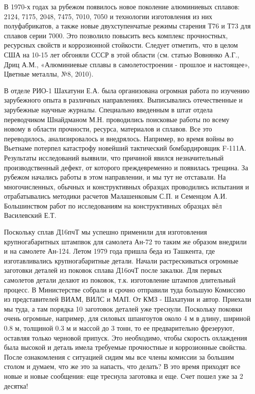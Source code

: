 В 1970-х годах за рубежом появилось новое поколение алюминиевых сплавов: 2124,
7175, 2048, 7475, 7010, 7050 и технологии изготовления из них полуфабрикатов, а
также новые двухступенчатые режимы старения Т76 и Т73 для сплавов серии 7000.
Это позволило повысить весь комплекс прочностных, ресурсных свойств и
коррозионной стойкости. Следует отметить, что в целом США на 10-15 лет обгоняли
СССР в этой области (см. статью Вовнянко А.Г., Дриц А.М., «Алюминиевые сплавы в
самолетостроении - прошлое и настоящее», Цветные металлы, №8, 2010).

В отделе РИО-1 Шахатуни Е.А. была организована огромная работа по изучению
зарубежного опыта в различных направлениях. Выписывались отечественные и
зарубежные научные журналы. Специально введенным в штат отдела переводчиком
Шнайдманом М.Н. проводились поисковые работы по всему новому в области
прочности, ресурса, материалов и сплавов. Все это переводилось, анализировалось
и внедрялось. Например, во время войны во Вьетнаме потерпел катастрофу новейший
тактический бомбардировщик F-111А. Результаты исследований выявили, что
причиной явился незначительный производственный дефект, от которого
преждевременно и появилась трещина. За рубежом начались работы в этом
направлении, и мы тут не отставали. На многочисленных, обычных и конструктивных
образцах проводились испытания и отрабатывались методики расчетов Малашенковым
С.П. и Семенцом А.И. Большинством работ по исследованиям на конструктивных
образцах вёл Василевский Е.Т.

Поскольку сплав Д16пчТ мы успешно применили для изготовления крупногабаритных
штампвок для самолета Ан-72 то таким же образом внедрили и на самолете Ан-124.
Летом 1979 года пришла беда из Ташкента, где изготавливались крупногабаритные
детали. Начали растрескиваться огромные заготовки деталей из поковок сплава
Д16очТ после закалки. Для первых самолетов детали делают из поковок, т.к.
изготовление штампов длительный процесс. В Министерстве собрали и срочно
отправили туда большую Комиссию из представителей ВИАМ, ВИЛС и МАП. От КМЗ -
Шахатуни и автор. Приехали мы туда, а там порядка 10 заготовок деталей уже
треснули. Поскольку поковки очень огромные, например, для силовых шпангоутов
около 4 м в длину, шириной 0.8 м, толщиной 0.3 м и массой до 3 тонн, то ее
предварительно фрезеруют, оставляя только черновой припуск. Это необходимо,
чтобы скорость охлаждения была высокой и деталь имела требуемые прочностные и
коррозионные свойства. После ознакомления с ситуацией сидим мы все члены
комиссии за большим столом и думаем, что же это за напасть, что делать? В это
время приходят все новые и новые сообщения: еще треснула заготовка и еще. Счет
пошел уже за 2 десятка!

